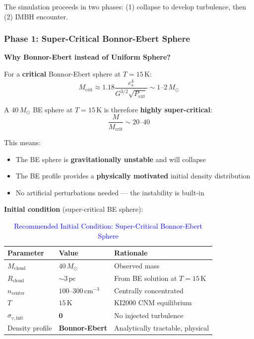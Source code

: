 \documentclass[11pt,a4paper]{article}
\newcommand{\Msun}{M_\odot}
\newcommand{\pc}{\,\mathrm{pc}}
\newcommand{\cmcubed}{\,\mathrm{cm^{-3}}}
\begin{document}
The simulation proceeds in two phases: (1) collapse to develop turbulence,
then (2) IMBH encounter.

\subsubsection{Phase 1: Super-Critical Bonnor-Ebert Sphere}

\textbf{Why Bonnor-Ebert instead of Uniform Sphere?}

For a \textbf{critical} Bonnor-Ebert sphere at $T = 15\,\mathrm{K}$:
\begin{equation}
    M_\mathrm{crit} \approx 1.18 \frac{c_s^4}{G^{3/2} \sqrt{P_\mathrm{ext}}} \sim 1\text{--}2\,\Msun
\end{equation}

A $40\,\Msun$ BE sphere at $T = 15\,\mathrm{K}$ is therefore \textbf{highly super-critical}:
\begin{equation}
    \frac{M}{M_\mathrm{crit}} \sim 20\text{--}40
\end{equation}

This means:
\begin{itemize}
    \item The BE sphere is \textbf{gravitationally unstable} and will collapse
    \item The BE profile provides a \textbf{physically motivated} initial density distribution
    \item No artificial perturbations needed --- the instability is built-in
\end{itemize}

\textbf{Initial condition} (super-critical BE sphere):

\begin{table}[h]
\centering
\caption{\textcolor{blue}{Recommended Initial Condition: Super-Critical Bonnor-Ebert Sphere}}
\begin{tabular}{lll}
\toprule
\textbf{Parameter} & \textbf{Value} & \textbf{Rationale} \\
\midrule
$M_\mathrm{cloud}$ & $40\,\Msun$ & Observed mass \\
$R_\mathrm{cloud}$ & $\sim 3\pc$ & From BE solution at $T = 15\,\mathrm{K}$ \\
$n_\mathrm{center}$ & $100$--$300\cmcubed$ & Centrally concentrated \\
$T$ & $15\,\mathrm{K}$ & KI2000 CNM equilibrium \\
$\sigma_{v,\mathrm{init}}$ & \textbf{0} & No injected turbulence \\
Density profile & \textbf{Bonnor-Ebert} & Analytically tractable, physical \\
\bottomrule
\end{tabular}
\end{table}
\end{document}
